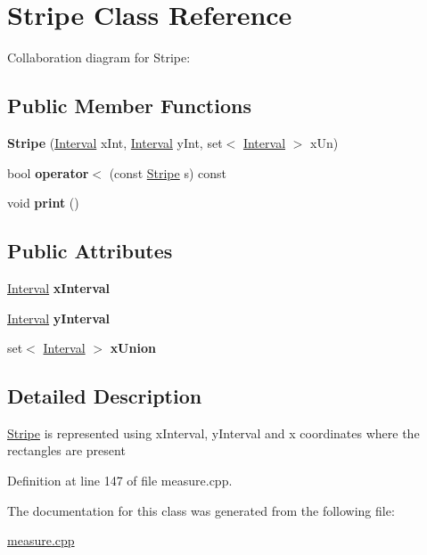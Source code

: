 \hypertarget{classStripe}{}\section{Stripe Class Reference}
\label{classStripe}


Collaboration diagram for Stripe\+:
\subsection*{Public Member Functions}
\begin{DoxyCompactItemize}
\item 
\mbox{\label{classStripe_ac7bb0d37787ad666b6e68b45655897ea}} 
{\bfseries Stripe} (\hyperlink{classInterval}{Interval} x\+Int, \hyperlink{classInterval}{Interval} y\+Int, set$<$ \hyperlink{classInterval}{Interval} $>$ x\+Un)
\item 
\mbox{\label{classStripe_ad29dec3d3ad78ad995b646aaa33bf301}} 
bool {\bfseries operator$<$} (const \hyperlink{classStripe}{Stripe} s) const
\item 
\mbox{\label{classStripe_af8f924ca899c00510f396cce954793e3}} 
void {\bfseries print} ()
\end{DoxyCompactItemize}
\subsection*{Public Attributes}
\begin{DoxyCompactItemize}
\item 
\mbox{\label{classStripe_a59cfef264428dc338c2a57ce07d3f988}} 
\hyperlink{classInterval}{Interval} {\bfseries x\+Interval}
\item 
\mbox{\label{classStripe_a81c586918c348f569c5579595d69ce00}} 
\hyperlink{classInterval}{Interval} {\bfseries y\+Interval}
\item 
\mbox{\label{classStripe_aeffc0b68b95b8da742e79b5ed656f268}} 
set$<$ \hyperlink{classInterval}{Interval} $>$ {\bfseries x\+Union}
\end{DoxyCompactItemize}


\subsection{Detailed Description}
\hyperlink{classStripe}{Stripe} is represented using x\+Interval, y\+Interval and x coordinates where the rectangles are present 

Definition at line 147 of file measure.\+cpp.



The documentation for this class was generated from the following file\+:\begin{DoxyCompactItemize}
\item 
\hyperlink{measure_8cpp}{measure.\+cpp}\end{DoxyCompactItemize}
